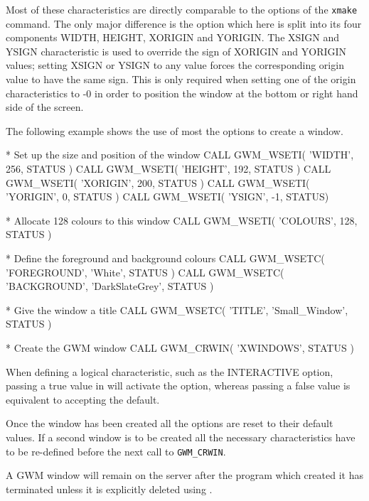 \documentclass[twoside,11pt,nolof]{starlink}
\begin{document}
Most of these characteristics are directly comparable to the options
of the \texttt{xmake} command. The only major difference is the
\texttt{}
option which here is split into its four components WIDTH, HEIGHT, XORIGIN
and YORIGIN. The XSIGN and YSIGN characteristic is used to override the sign of
XORIGIN and YORIGIN values; setting XSIGN or YSIGN
to any value forces the corresponding origin value to have the same
sign. This is only required when setting one of the
origin characteristics to -0 in order to position the window at the
bottom or right hand side of the screen.

The following example shows the use of most the options to create a window.

\begin{small}
\begin{terminalv}
*   Set up the size and position of the window
     CALL GWM_WSETI( 'WIDTH', 256, STATUS )
     CALL GWM_WSETI( 'HEIGHT', 192, STATUS )
     CALL GWM_WSETI( 'XORIGIN', 200, STATUS )
     CALL GWM_WSETI( 'YORIGIN', 0, STATUS )
     CALL GWM_WSETI( 'YSIGN', -1, STATUS)

*   Allocate 128 colours to this window
     CALL GWM_WSETI( 'COLOURS', 128, STATUS )

*   Define the foreground and background colours
     CALL GWM_WSETC( 'FOREGROUND', 'White', STATUS )
     CALL GWM_WSETC( 'BACKGROUND', 'DarkSlateGrey', STATUS )

*   Give the window a title
     CALL GWM_WSETC( 'TITLE', 'Small_Window', STATUS )

*   Create the GWM window
     CALL GWM_CRWIN( 'XWINDOWS', STATUS )
\end{terminalv}
\end{small}

When defining a logical characteristic, such as the INTERACTIVE option,
passing a true value in \texttt{}
will activate the option,
whereas passing a false value is equivalent to accepting the default.

Once the window has been created all the options are reset to their
default values. If a second window is to be created all the necessary
characteristics have to be re-defined before the next call to
\texttt{GWM\_CRWIN}.

A GWM window will remain on the server after the program which created
it has terminated unless it is explicitly deleted using
\texttt{}.
\end{document}
